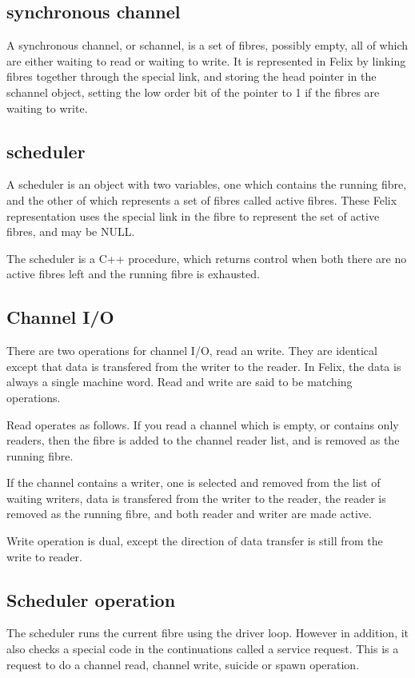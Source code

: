 \documentclass[oneside]{book}
\begin{document}
\subsection{synchronous channel}
A synchronous channel, or schannel, is a set of fibres, possibly empty,
all of which are either waiting to read or waiting to write. It is represented
in Felix by linking fibres together through the special link, and storing
the head pointer in the schannel object, setting the low order bit of the
pointer to 1 if the fibres are waiting to write.

\subsection{scheduler}
A scheduler is an object with two variables, one which contains
the running fibre, and the other of which represents a set of fibres
called active fibres. These Felix representation uses the special link
in the fibre to represent the set of active fibres, and may be NULL.

The scheduler is a C++ procedure, which returns control when both there
are no active fibres left and the running fibre is exhausted.

\subsection{Channel I/O}
There are two operations for channel I/O, read an write.
They are identical except that data is transfered from the writer
to the reader. In Felix, the data is always a single machine word.
Read and write are said to be matching operations.

Read operates as follows. If you read a channel which is empty,
or contains only readers, then the fibre is added to the channel
reader list, and is removed as the running fibre.

If the channel contains a writer, one is selected and removed
from the list of waiting writers, data is transfered from the writer
to the reader, the reader is removed as the running fibre, and both
reader and writer are made active.

Write operation is dual, except the direction of data transfer
is still from the write to reader.

\subsection{Scheduler operation}
The scheduler runs the current fibre using the driver loop.
However in addition, it also checks a special code in the continuations
called a service request. This is a request to do a channel read, channel
write, suicide or spawn operation.
\end{document}

